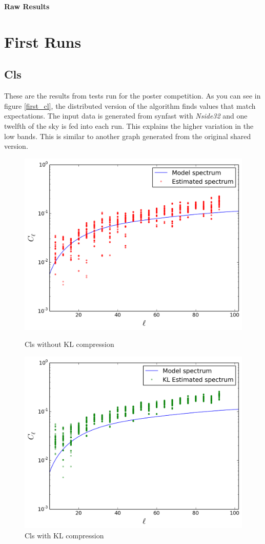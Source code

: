 \documentclass[twocolumn]{article}
\begin{document}
\begin{center}\Large\textbf{Raw Results}\end{center}

\section{First Runs}

\subsection{Cls}
These are the results from tests run for the poster competition. As you can see in figure \ref{first_cl}, the distributed version of the algorithm finds values that match expectations. The input data is generated from synfast with \emph{Nside32} and one twelfth of the sky is fed into each run. This explains the higher variation in the low bands. This is similar to another graph generated from the original shared version.


\begin{figure}
\includegraphics[width=0.9\columnwidth]{figures/cl}
\caption{Cls without KL compression}
\label{first_cl}
\includegraphics[width=0.9\columnwidth]{figures/kl_cl}
\caption{Cls with KL compression}
\label{first_kl_cl}
\end{figure}
\end{document}
